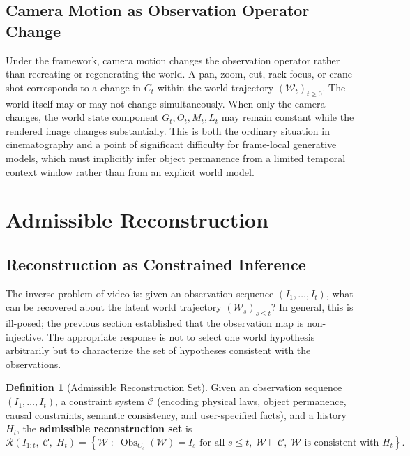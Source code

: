 \documentclass[12pt,a4paper]{article}
\theoremstyle{plain}
\theoremstyle{definition}
\newtheorem{definition}[theorem]{Definition}
\theoremstyle{remark}
\DeclareMathOperator{\Obs}{Obs}
\begin{document}
\subsection{Camera Motion as Observation Operator Change}

Under the framework, camera motion changes the observation operator rather than recreating or regenerating the world. A pan, zoom, cut, rack focus, or crane shot corresponds to a change in $C_t$ within the world trajectory $(\mathcal{W}_t)_{t \geq 0}$. The world itself may or may not change simultaneously. When only the camera changes, the world state component $G_t, O_t, M_t, L_t$ may remain constant while the rendered image changes substantially. This is both the ordinary situation in cinematography and a point of significant difficulty for frame-local generative models, which must implicitly infer object permanence from a limited temporal context window rather than from an explicit world model.

\section{Admissible Reconstruction}
\label{sec:admissible}

\subsection{Reconstruction as Constrained Inference}

The inverse problem of video is: given an observation sequence $(I_1, \ldots, I_t)$, what can be recovered about the latent world trajectory $(\mathcal{W}_s)_{s \leq t}$? In general, this is ill-posed; the previous section established that the observation map is non-injective. The appropriate response is not to select one world hypothesis arbitrarily but to characterize the set of hypotheses consistent with the observations.

\begin{definition}[Admissible Reconstruction Set]
Given an observation sequence $(I_1, \ldots, I_t)$, a constraint system $\mathcal{C}$ (encoding physical laws, object permanence, causal constraints, semantic consistency, and user-specified facts), and a history $H_t$, the \textbf{admissible reconstruction set} is
\[
\mathcal{R}(I_{1:t},\; \mathcal{C},\; H_t) = \left\{ \mathcal{W} \;:\; \Obs_{C_s}(\mathcal{W}) = I_s \text{ for all } s \leq t,\; \mathcal{W} \models \mathcal{C},\; \mathcal{W} \text{ is consistent with } H_t \right\}.
\]
\end{definition}
\end{document}

